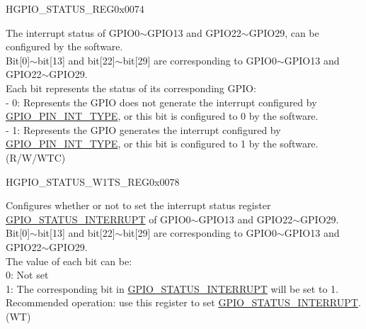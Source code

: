\begin{register}{H}{GPIO\_STATUS\_REG}{0x0074}\label{regdesc:GPIOSTATUSREG}
%
\regnewline%
\begin{regdesc}\begin{reglist}
\label{fielddesc:GPIOSTATUSINTERRUPT}\item [GPIO\_STATUS\_INTERRUPT] The interrupt status of GPIO0$\sim$GPIO13 and GPIO22$\sim$GPIO29, can be configured by the software. \\
Bit[0]$\sim$bit[13] and bit[22]$\sim$bit[29] are corresponding to GPIO0$\sim$GPIO13 and GPIO22$\sim$GPIO29.\\
Each bit represents the status of its corresponding GPIO:\\
    - 0: Represents the GPIO does not generate the interrupt configured by \hyperref[fielddesc:GPIOPINNINTTYPE]{GPIO\_PIN\_INT\_TYPE}, or this bit is configured to 0 by the software.\\
    - 1: Represents the GPIO generates the interrupt configured by \hyperref[fielddesc:GPIOPINNINTTYPE]{GPIO\_PIN\_INT\_TYPE}, or this bit is configured to 1 by the software.\\
 (R/W/WTC)
\end{reglist}\end{regdesc}
\end{register}


\begin{register}{H}{GPIO\_STATUS\_W1TS\_REG}{0x0078}\label{regdesc:GPIOSTATUSW1TSREG}
%
\regnewline%
\begin{regdesc}\begin{reglist}
\label{fielddesc:GPIOSTATUSW1TS}\item [GPIO\_STATUS\_W1TS] Configures whether or not to set the interrupt status register \hyperref[fielddesc:GPIOSTATUSINTERRUPT]{GPIO\_STATUS\_INTERRUPT} of GPIO0$\sim$GPIO13 and GPIO22$\sim$GPIO29. \\
Bit[0]$\sim$bit[13] and bit[22]$\sim$bit[29] are corresponding to GPIO0$\sim$GPIO13 and GPIO22$\sim$GPIO29.\\
The value of each bit can be:\\
0: Not set\\
1: The corresponding bit in \hyperref[fielddesc:GPIOSTATUSINTERRUPT]{GPIO\_STATUS\_INTERRUPT} will be set to 1. \\
Recommended operation: use this register to set \hyperref[fielddesc:GPIOSTATUSINTERRUPT]{GPIO\_STATUS\_INTERRUPT}. \\
 (WT)
\end{reglist}\end{regdesc}
\end{register}



